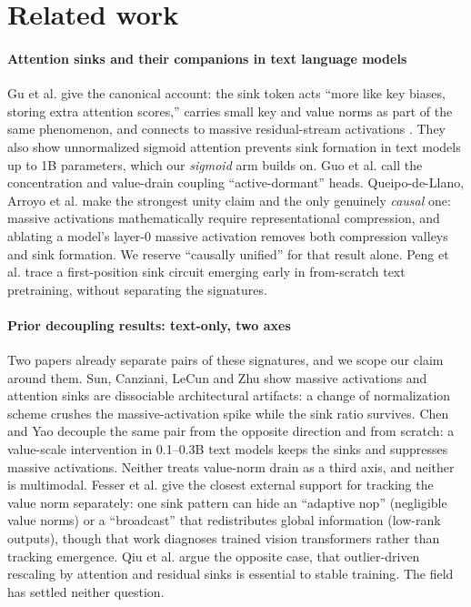 \documentclass{article}
\begin{document}
\section{Related work}

\paragraph{Attention sinks and their companions in text language models} Gu et al. \cite{ref6} give the canonical account: the sink token acts ``more like key biases, storing extra attention scores,'' carries small key and value norms as part of the same phenomenon, and connects to massive residual-stream activations \cite{ref2,ref5}. They also show unnormalized sigmoid attention prevents sink formation in text models up to 1B parameters, which our \textit{sigmoid} arm builds on. Guo et al. \cite{ref4} call the concentration and value-drain coupling ``active-dormant'' heads. Queipo-de-Llano, Arroyo et al. \cite{ref7} make the strongest unity claim and the only genuinely \textit{causal} one: massive activations mathematically require representational compression, and ablating a model's layer-0 massive activation removes both compression valleys and sink formation. We reserve ``causally unified'' for that result alone. Peng et al. \cite{ref24} trace a first-position sink circuit emerging early in from-scratch text pretraining, without separating the signatures.

\paragraph{Prior decoupling results: text-only, two axes} Two papers already separate pairs of these signatures, and we scope our claim around them. Sun, Canziani, LeCun and Zhu \cite{ref9} show massive activations and attention sinks are dissociable architectural artifacts: a change of normalization scheme crushes the massive-activation spike while the sink ratio survives. Chen and Yao \cite{ref10} decouple the same pair from the opposite direction and from scratch: a value-scale intervention in 0.1--0.3B text models keeps the sinks and suppresses massive activations. Neither treats value-norm drain as a third axis, and neither is multimodal. Fesser et al. \cite{ref23} give the closest external support for tracking the value norm separately: one sink pattern can hide an ``adaptive nop'' (negligible value norms) or a ``broadcast'' that redistributes global information (low-rank outputs), though that work diagnoses trained vision transformers rather than tracking emergence. Qiu et al. \cite{ref8} argue the opposite case, that outlier-driven rescaling by attention and residual sinks is essential to stable training. The field has settled neither question.
\end{document}
